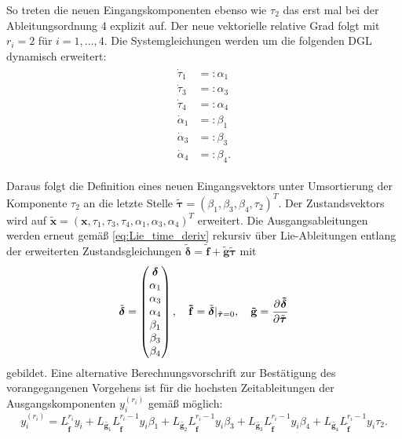 So treten die neuen Eingangskomponenten ebenso wie $\tau_2$ das erst mal bei der Ableitungsordnung 4 explizit auf. Der neue vektorielle relative Grad folgt mit $r_i = 2$ für $i = 1, ..., 4$. Die Systemgleichungen werden um die folgenden DGL dynamisch erweitert:
\begin{align}
	\begin{split}
		\dot{\tau}_1 &=: \alpha_1 \\
		\dot{\tau}_3 &=: \alpha_3 \\
		\dot{\tau}_4 &=: \alpha_4 \\
		\dot{\alpha}_1 &=: \beta_1 \\
		\dot{\alpha}_3 &=: \beta_3 \\
		\dot{\alpha}_4 &=: \beta_4 .
	\end{split}
\end{align}

Daraus folgt die Definition eines neuen Eingangsvektors unter Umsortierung der Komponente $\tau_2$ an die letzte Stelle $\tilde{\boldsymbol{\tau}} = (\beta_1,  \beta_3,  \beta_4, \tau_2)^T$. Der Zustandsvektors wird auf $\tilde{\mathbf{x}} = (\mathbf{x}, \tau_1, \tau_3, \tau_4, \alpha_1, \alpha_3, \alpha_4)^T$ erweitert. Die Ausgangsableitungen werden erneut gemäß \eqref{eq:Lie_time_deriv} rekursiv über Lie-Ableitungen entlang der erweiterten Zustandsgleichungen  $\tilde{\boldsymbol{\delta}} = \mathbf{\tilde{f}} + \mathbf{\tilde{g}} \tilde{\boldsymbol{\tau}}$ mit
\begin{align}
	\tilde{\boldsymbol{\delta}} =
	\left(\begin{matrix}
		\boldsymbol{\delta} \\
		\alpha_1 \\
		\alpha_3 \\
		\alpha_4 \\
		\beta_1 \\
		\beta_3 \\
		\beta_4 \\	
	\end{matrix}\right), \quad
	\mathbf{\tilde{f}} = \tilde{\boldsymbol{\delta}}|_{\tilde{\boldsymbol{\tau}} = 0}, \quad
	\mathbf{\tilde{g}} = \frac{\partial^{}\boldsymbol{\tilde{\delta}}}{\partial{\tilde{\boldsymbol{\tau}}}^{}}
\end{align}
gebildet. Eine alternative Berechnungsvorschrift zur Bestätigung des vorangegangenen Vorgehens ist für die hochsten Zeitableitungen der Ausgangskomponenten $y_i^{(r_i)}$ gemäß \cite[S. 195]{NLRT_Roebenack} möglich:
\begin{equation}
	y_i^{(r_i)} = L_{\tilde{\mathbf{f}}}^{r_i} y_i + L_{\tilde{\mathbf{g}_1}} L_{\tilde{\mathbf{f}}}^{r_i-1} y_i \beta_1 + L_{\tilde{\mathbf{g}_2}} L_{\tilde{\mathbf{f}}}^{r_i-1} y_i \beta_3 + L_{\tilde{\mathbf{g}_3}} L_{\tilde{\mathbf{f}}}^{r_i-1} y_i \beta_4 + L_{\tilde{\mathbf{g}_4}} L_{\tilde{\mathbf{f}}}^{r_i-1} y_i \tau_2 .
\end{equation}

